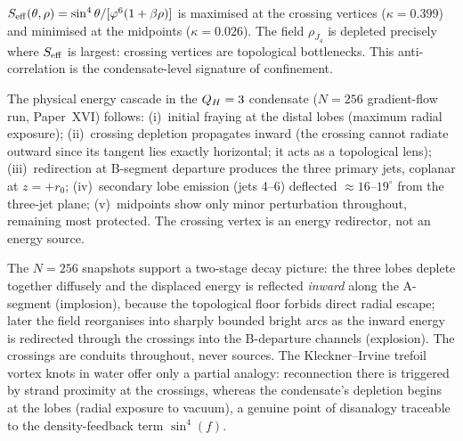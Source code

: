 \begin{proposition}
\label{P18:prop:anticorrelation}
$S_{\rm eff}(\theta,\rho)=\sin^4\theta/[\varphi^6(1+\beta\rho)]$ is
maximised at the crossing vertices ($\kappa=0.399$) and minimised at
the midpoints ($\kappa=0.026$). The field $\rho_{J_4}$ is depleted
precisely where $S_{\rm eff}$ is largest: crossing vertices are
topological bottlenecks. This anti-correlation is the
condensate-level signature of confinement.
\end{proposition}

\begin{proposition}
\label{P18:prop:cascade_p18}
The physical energy cascade in the $Q_H=3$ condensate ($N=256$
gradient-flow run, Paper~XVI) follows: (i)~initial fraying at the
distal lobes (maximum radial exposure); (ii)~crossing depletion
propagates inward (the crossing cannot radiate outward since its
tangent lies exactly horizontal; it acts as a topological lens);
(iii)~redirection at B-segment departure produces the three primary
jets, coplanar at $z=+r_0$; (iv)~secondary lobe emission (jets 4--6)
deflected $\approx16$--$19^\circ$ from the three-jet plane;
(v)~midpoints show only minor perturbation throughout, remaining
most protected. The crossing vertex is an energy redirector, not an
energy source.
\end{proposition}

\begin{remark}
\label{P18:rem:implode_explode}
The $N=256$ snapshots support a two-stage decay picture: the three
lobes deplete together diffusely and the displaced energy is
reflected \emph{inward} along the A-segment (implosion), because the
topological floor forbids direct radial escape; later the field
reorganises into sharply bounded bright arcs as the inward energy is
redirected through the crossings into the B-departure channels
(explosion). The crossings are conduits throughout, never sources.
The Kleckner--Irvine trefoil vortex knots in water offer only a
partial analogy: reconnection there is triggered by strand proximity
at the crossings, whereas the condensate's depletion begins at the
lobes (radial exposure to vacuum), a genuine point of disanalogy
traceable to the density-feedback term $\sin^4(f)$.
\end{remark}

